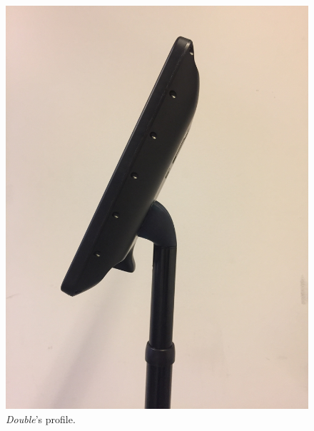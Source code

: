 \begin{figure}[H]
\begin{minipage}{.25\textwidth}
  \includegraphics[width=\linewidth, angle =-90]{Figure/ModificeretDoubleSideClose}
  \caption{\textit{Double}'s profile.}
  \label{fig:ModificeretDoubleSideClose}
\end{minipage}
\end{figure}
\noindent
%

